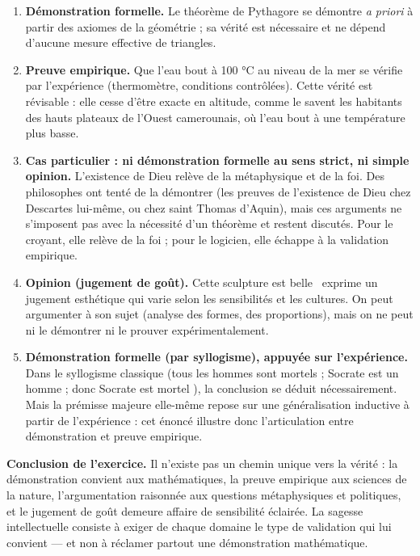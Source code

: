 \documentclass[11pt]{article}
\newcommand{\cle}[1]{{\popxbold\color{popdark}#1}}
\begin{document}
\begin{corrige}
\begin{enumerate}
\item \textbf{Démonstration formelle.} Le théorème de Pythagore se démontre \emph{a priori} à partir des axiomes de la géométrie ; sa vérité est \cle{nécessaire} et ne dépend d'aucune mesure effective de triangles.
\item \textbf{Preuve empirique.} Que l'eau bout à 100 °C au niveau de la mer se vérifie par l'expérience (thermomètre, conditions contrôlées). Cette vérité est \cle{révisable} : elle cesse d'être exacte en altitude, comme le savent les habitants des hauts plateaux de l'Ouest camerounais, où l'eau bout à une température plus basse.
\item \textbf{Cas particulier : ni démonstration formelle au sens strict, ni simple opinion.} L'existence de Dieu relève de la \cle{métaphysique} et de la \cle{foi}. Des philosophes ont tenté de la démontrer (les preuves de l'existence de Dieu chez Descartes lui-même, ou chez saint Thomas d'Aquin), mais ces arguments ne s'imposent pas avec la nécessité d'un théorème et restent discutés. Pour le croyant, elle relève de la foi ; pour le logicien, elle échappe à la validation empirique.
\item \textbf{Opinion (jugement de goût).} \guillemotleft Cette sculpture est belle \guillemotright\ exprime un \cle{jugement esthétique} qui varie selon les sensibilités et les cultures. On peut \cle{argumenter} à son sujet (analyse des formes, des proportions), mais on ne peut ni le démontrer ni le prouver expérimentalement.
\item \textbf{Démonstration formelle (par \cle{syllogisme}), appuyée sur l'expérience.} Dans le syllogisme classique (\guillemotleft tous les hommes sont mortels ; Socrate est un homme ; donc Socrate est mortel \guillemotright), la conclusion se déduit \cle{nécessairement}. Mais la prémisse majeure elle-même repose sur une \cle{généralisation inductive} à partir de l'expérience : cet énoncé illustre donc l'articulation entre démonstration et preuve empirique.
\end{enumerate}

\textbf{Conclusion de l'exercice.} Il n'existe pas un chemin unique vers la vérité : la démonstration convient aux mathématiques, la preuve empirique aux sciences de la nature, l'\cle{argumentation raisonnée} aux questions métaphysiques et politiques, et le jugement de goût demeure affaire de \cle{sensibilité éclairée}. La sagesse intellectuelle consiste à exiger de chaque domaine le type de validation qui lui convient — et non à réclamer partout une démonstration mathématique.
\end{corrige}
\end{document}
